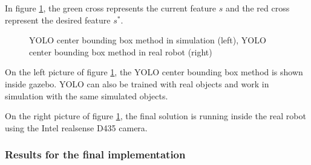 In figure \ref{pict:yolo_simulation_real}, the green cross represents the current feature $s$ and the red cross represent the desired feature $s^*$. 

\begin{figure}[!ht]
     \centering
     \label{<figure_simulation>]}
     \label{<figure_real>]}
     \caption{YOLO center bounding box method in simulation (left), YOLO center bounding box method in real robot (right)}
     \label{pict:yolo_simulation_real}
\end{figure}

On the left picture of figure \ref{pict:yolo_simulation_real}, the YOLO center bounding box method is shown inside gazebo. YOLO can also be trained with real objects and work in simulation with the same simulated objects.

On the right picture of figure \ref{pict:yolo_simulation_real}, the final solution is running inside the real robot using the Intel realsense D435 camera.

\subsubsection{Results for the final implementation}

